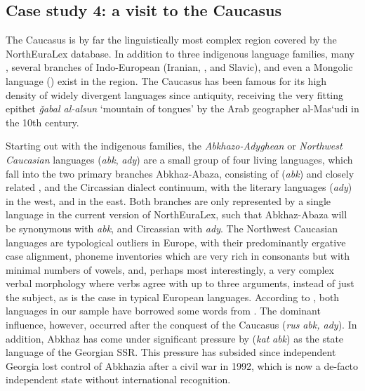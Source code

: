 \subsection{Case study 4: a visit to the Caucasus}
The Caucasus is by far the linguistically most complex region covered by the NorthEuraLex database. In addition to three indigenous language families, many , several branches of Indo-European (Iranian, , and Slavic), and even a Mongolic language () exist in the region. The Caucasus has been famous for its high density of widely divergent languages since antiquity, receiving the very fitting epithet \textit{\v{g}abal al-alsun} `mountain of tongues' by the Arab geographer al-Mas\textquoteleft udi in the 10th century.

Starting out with the indigenous families, the \textit{Abkhazo-Adyghean} or \textit{Northwest Caucasian} languages (\textit{abk}, \textit{ady}) are a small group of four living languages, which fall into the two primary branches Abkhaz-Abaza, consisting of  (\textit{abk}) and closely related , and the Circassian dialect continuum, with the literary languages  (\textit{ady}) in the west, and  in the east. Both branches are only represented by a single language in the current version of NorthEuraLex, such that Abkhaz-Abaza will be synonymous with \textit{abk}, and Circassian with \textit{ady}. The Northwest Caucasian languages are typological outliers in Europe, with their predominantly ergative case alignment, phoneme inventories which are very rich in consonants but with minimal numbers of vowels, and, perhaps most interestingly, a very complex verbal morphology where 
verbs agree with up to three arguments, instead of just the subject, as is the case in typical European languages. According to \cite{hewitt2004}, both languages in our sample have borrowed some words from . The dominant influence, however, occurred after the  conquest of the Caucasus (\textit{rus} \arrowLA \textit{abk, ady}). In addition, Abkhaz has come under significant pressure by  (\textit{kat} \arrowLA \textit{abk}) as the state language of the Georgian SSR. This pressure has subsided since independent Georgia lost control of Abkhazia after a civil war in 1992, which is now a de-facto independent state without international recognition.

